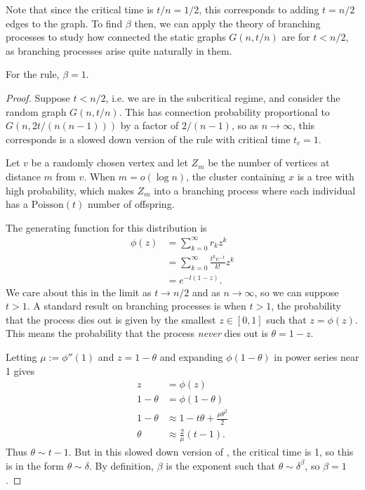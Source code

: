 \documentclass[twoside,10pt]{article}
\newcommand{\poisson}{\text{Poisson}}
\begin{document}
Note that since the critical time is $t/n = 1/2$, this corresponds to adding $t=n/2$ edges to the graph. To find $\beta$ then, we can apply the theory of branching processes to study how connected the static graphs $G(n,t/n)$ are for $t < n/2$, as branching processes arise quite naturally in them.

\begin{thrm}[]
For the \ER rule, $\beta=1$.
\end{thrm}
\begin{proof}
	Suppose $t<n/2$, i.e. we are in the subcritical regime, and consider the \ER random graph $G(n,t/n)$. This has connection probability proportional to $G(n, 2t/(n (n-1)))$ by a factor of $2/(n-1)$, so as $n\to \infty$, this corresponds is a slowed down version of the \ER rule with critical time $t_{c}=1$.

	Let $v$ be a randomly chosen vertex and let $Z_{m}$ be the number of vertices at distance $m$ from $v$. When $m=o(\log n)$, the cluster containing $x$ is a tree with high probability, which makes $Z_{m}$ into a branching process where each individual has a $\poisson(t)$ number of offspring.

	The generating function for this distribution is
	\begin{align*}
		\phi(z) &= \sum_{k=0}^{\infty} r_{k}z^{k} \\
			&= \sum_{k=0}^{\infty} \frac{t^{k} e^{-t}}{k!} z^{k} \\
			&= e^{-t(1-z)}.
	\end{align*}
	We care about this in the limit as $t\to n/2$ and as $n\to \infty$, so we can suppose $t>1$. A standard result on branching processes is when $t>1$, the probability that the process dies out is given by the smallest $z \in [0,1]$ such that $z = \phi(z)$. This means the probability that the process \textit{never} dies out is $\theta = 1-z$.

	Letting $\mu := \phi''(1)$ and $z=1-\theta$ and expanding $\phi(1-\theta)$ in power series near 1 gives
	\begin{align*}
		z &= \phi(z) \\
		1-\theta &= \phi(1-\theta) \\
		1-\theta &\approx 1-t\theta + \frac{\mu\theta^{2}}{2} \\
		\theta &\approx \frac{2}{\mu} (t-1).
	\end{align*}
	Thus $\theta \sim t-1$. But in this slowed down version of \ER, the critical time is 1, so this is in the form $\theta \sim \delta$. By definition, $\beta$ is the exponent such that $\theta \sim \delta^{\beta}$, so $\beta=1$.
\end{proof}
\end{document}
